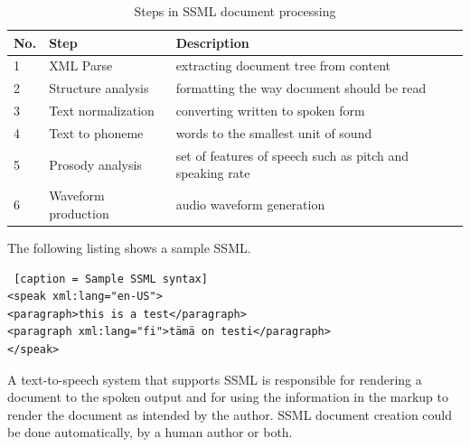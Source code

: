 \documentclass[11pt,a4paper,oneside,article]{memoir}
\begin{document}
\begin{table}[h]
 \caption{Steps in SSML document processing}
    \begin{tabular}{ | l | l | l | }
    \hline
    No. &Step &Description \\ \hline
    1 & XML Parse & extracting document tree from content \\ \hline
    2 & Structure analysis  & formatting the way document should be read  \\ \hline
    3 & Text normalization  & converting written to spoken form\\ \hline
    4 & Text to phoneme  &  words to the smallest unit of sound  \\ \hline
    5 & Prosody analysis  &   set of features of speech such as pitch and speaking rate\\ \hline
    6 & Waveform production  & audio waveform generation  \\ \hline  
    \end{tabular}
\end{table}




The following listing shows a sample SSML.
\begin{lstlisting} [caption = Sample SSML syntax]
<speak xml:lang="en-US">
<paragraph>this is a test</paragraph>
<paragraph xml:lang="fi">tämä on testi</paragraph>
</speak>
\end{lstlisting}
A text-to-speech system that supports SSML is responsible for rendering a document to the spoken output and for using the information in the markup to render the document as intended by the author. SSML document creation could be done automatically, by a human author or both.
\end{document}

